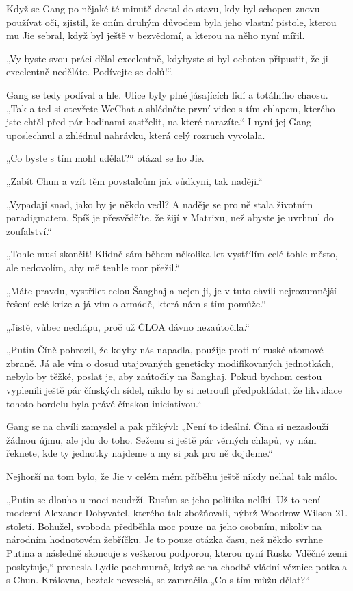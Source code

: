 {Když se Gang po nějaké té minutě dostal do stavu, kdy byl schopen znovu používat oči, zjistil, že oním druhým důvodem byla jeho vlastní pistole, kterou mu Jie sebral, když byl ještě v bezvědomí,  a kterou na něho nyní mířil.

„Vy byste svou práci dělal excelentně, kdybyste si byl ochoten připustit, že ji excelentně neděláte. Podívejte se dolů!“. 

Gang se tedy podíval a hle. Ulice byly plné jásajících lidí a totálního chaosu. „Tak a teď si otevřete WeChat a shlédněte první video s tím chlapem, kterého jste chtěl před pár hodinami zastřelit, na které narazíte.“  I nyní jej Gang uposlechnul a zhlédnul nahrávku, která celý rozruch vyvolala.

„Co byste s tím mohl udělat?“ otázal se ho Jie.

„Zabít Chun a vzít těm povstalcům jak vůdkyni, tak naději.“

„Vypadají snad, jako by je někdo vedl? A naděje se pro ně stala životním paradigmatem. Spíš je přesvědčíte, že žijí v Matrixu, než abyste je uvrhnul do zoufalství.“

„Tohle musí skončit! Klidně sám během několika let vystřílím celé tohle město, ale nedovolím, aby mě tenhle mor přežil.“

„Máte pravdu, vystřílet celou Šanghaj a nejen ji, je v tuto chvíli nejrozumnější řešení celé krize a já vím o armádě, která nám s tím pomůže.“

„Jistě, vůbec nechápu, proč už ČLOA dávno nezaútočila.“

„Putin Číně pohrozil, že kdyby nás napadla, použije proti ní ruské atomové zbraně. Já ale vím o dosud utajovaných geneticky modifikovaných jednotkách, nebylo by těžké, poslat je, aby zaútočily na Šanghaj. Pokud bychom cestou vyplenili ještě pár čínských sídel, nikdo by si netroufl předpokládat, že likvidace tohoto bordelu byla právě čínskou iniciativou.“

Gang se na chvíli zamyslel a pak přikývl: „Není to ideální. Čína si nezaslouží žádnou újmu, ale jdu do toho. Seženu si ještě pár věrných chlapů, vy nám řeknete, kde ty jednotky najdeme a my si pak pro ně dojdeme.“

Nejhorší na tom bylo, že Jie v celém mém příběhu ještě nikdy nelhal tak málo.}
\vspace{0.75cm}

„Putin se dlouho u moci neudrží. Rusům se jeho politika nelíbí. Už to není moderní Alexandr Dobyvatel, kterého tak zbožňovali, nýbrž Woodrow Wilson 21. století. Bohužel, svoboda předběhla moc pouze na jeho osobním, nikoliv na národním hodnotovém žebříčku. Je to pouze otázka času, než někdo svrhne Putina a následně skoncuje s veškerou podporou, kterou nyní Rusko Vděčné zemi poskytuje,“ pronesla Lydie pochmurně, když se na chodbě vládní věznice potkala s Chun.
Královna, beztak neveselá, se zamračila.„Co s tím můžu dělat?“

